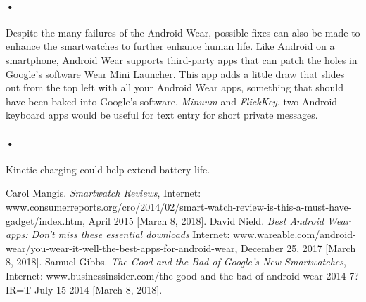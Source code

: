 \documentclass[7pt]{article}
\begin{document}
\paragraph{•}
Despite the many failures of the Android Wear, possible fixes can also be made to enhance the smartwatches to further enhance human life.
Like Android on a smartphone, Android Wear supports third-party apps that can patch the holes in Google's software 
Wear Mini Launcher. This app adds a little draw that slides out from the top left with all your Android Wear apps, something that should have been baked into Google's software.
\textit{Minuum} and \textit{FlickKey}, two Android keyboard apps would be useful for text entry for short private messages.

\paragraph{•} 
Kinetic charging could help extend battery life. \cite{gibbs}

\begin{thebibliography}{9}
 Carol Mangis. \textit{Smartwatch Reviews}, 
Internet: www.consumerreports.org/cro/2014/02/smart-watch-review-is-this-a-must-have-gadget/index.htm, April 2015 [March 8, 2018].
 David Nield. \textit{Best Android Wear apps: Don't miss these essential downloads} 
Internet: www.wareable.com/android-wear/you-wear-it-well-the-best-apps-for-android-wear, December 25, 2017 [March 8, 2018].
 Samuel Gibbs. \textit{The Good and the Bad of Google's New Smartwatches},
 Internet: www.businessinsider.com/the-good-and-the-bad-of-android-wear-2014-7?IR=T July 15 2014 [March 8, 2018].
\end{thebibliography}
\end{document}
